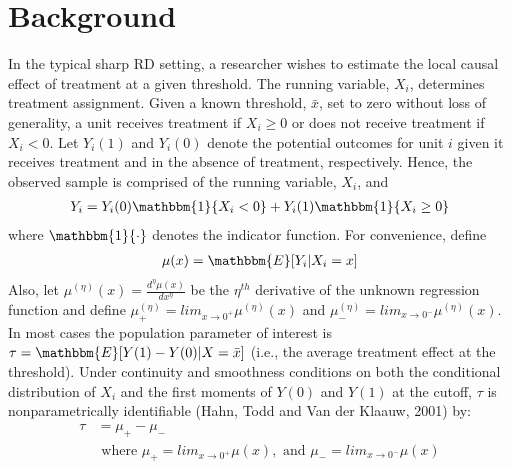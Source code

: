\documentclass[12pt,fleqn]{article}
\begin{document}
\section{Background}\label{background}
In the typical sharp RD setting, a researcher wishes to estimate the local 
causal effect of treatment at a given threshold. The running variable, $X_{i}$, 
determines treatment assignment.  Given a known threshold, $\bar{x}$, set to 
zero without loss of generality, a unit receives treatment if $X_{i} \geq 0$ or 
does not receive treatment if $X_{i} < 0$. Let $Y_{i}(1)$ and $Y_{i}(0)$ denote 
the potential outcomes for unit $i$ given it receives treatment and
 in the absence of treatment, respectively. Hence, the observed sample is 
 comprised of the running variable, $X_{i}$, and
 \begin{align}
  Y_{i}=Y_{i}(0) \mathbbm{1}\{X_{i}<0\}+Y_{i}(1) \mathbbm{1}\{X_{i} \geq 0\}
 \end{align}
where $\mathbbm{1}\{ \cdot\}$ denotes the indicator function. For convenience, 
define
 \begin{align}
  \mu(x)= \mathbbm{E}[Y_{i}|X_{i}=x]
 \end{align}
Also, let $\mu^{(\eta)}(x)=\frac{d^{\eta}\mu(x)}{dx^{\eta}}$ be the $\eta^{th}$ 
derivative of the unknown regression function and define 
$\mu^{(\eta)}_{+}=lim_{x \rightarrow 0^{+}}\mu^{(\eta)}(x)$ and 
$\mu^{(\eta)}_{-}=lim_{x \rightarrow 0^{-}}\mu^{(\eta)}(x)$.
In most cases the population parameter of interest is 
$\tau=\mathbbm{E}[Y(1)-Y(0)|X=\bar{x}]$ (i.e., the average treatment effect 
at the threshold). Under continuity and smoothness conditions on both the 
conditional distribution of $X_i$ and the first moments of $Y(0)$ and $Y(1)$ at
the cutoff, $\tau$ is nonparametrically identifiable (Hahn, Todd and Van der 
Klaauw, 2001) by:
\begin{align}
 \tau&= \mu_{+}- \mu_{-} \nonumber \\ 
&\text{ where } \mu_{+}=lim_{x \rightarrow 0^{+}}\mu(x),\text{ and } 
\mu_{-}=lim_{x \rightarrow 0^{-}}\mu(x)
\end{align}
\end{document}
